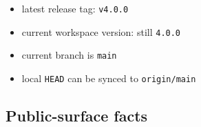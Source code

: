 \begin{itemize}
\tightlist
\item
  latest release tag: \texttt{v\allowbreak{}4\allowbreak{}.\allowbreak{}0\allowbreak{}.\allowbreak{}0}
\item
  current workspace version: still \texttt{4\allowbreak{}.\allowbreak{}0\allowbreak{}.\allowbreak{}0}
\item
  current branch is \texttt{m\allowbreak{}a\allowbreak{}i\allowbreak{}n}
\item
  local \texttt{H\allowbreak{}E\allowbreak{}A\allowbreak{}D} can be synced to \texttt{o\allowbreak{}r\allowbreak{}i\allowbreak{}g\allowbreak{}i\allowbreak{}n\allowbreak{}/\allowbreak{}m\allowbreak{}a\allowbreak{}i\allowbreak{}n}
\end{itemize}

\subsection{Public-surface facts}\label{record-202-public-surface-facts}

